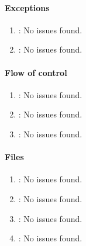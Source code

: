\paragraph{Exceptions} %
\label{par:exceptions}

\begin{enumerate} [resume]
	\item \emph{\checkAZ}: No issues found.
	\item \emph{\checkBA}: No issues found.
\end{enumerate}

\paragraph{Flow of control} %
\label{par:flow_of_control}

\begin{enumerate} [resume]
	\item \emph{\checkBB}: No issues found.
	\item \emph{\checkBC}: No issues found.
	\item \emph{\checkBD}: No issues found.
\end{enumerate}

\paragraph{Files} %
\label{par:files}

\begin{enumerate} [resume]
	\item \emph{\checkBE}: No issues found.
	\item \emph{\checkBF}: No issues found.
	\item \emph{\checkBG}: No issues found.
	\item \emph{\checkBH}: No issues found.
\end{enumerate}
